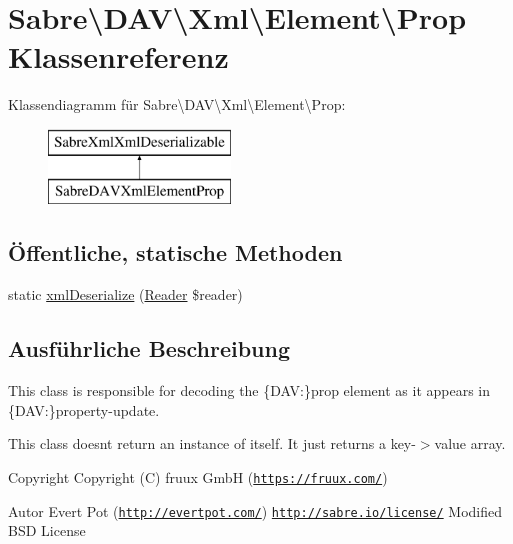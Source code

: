 \hypertarget{class_sabre_1_1_d_a_v_1_1_xml_1_1_element_1_1_prop}{}\section{Sabre\textbackslash{}D\+AV\textbackslash{}Xml\textbackslash{}Element\textbackslash{}Prop Klassenreferenz}
\label{class_sabre_1_1_d_a_v_1_1_xml_1_1_element_1_1_prop}
Klassendiagramm für Sabre\textbackslash{}D\+AV\textbackslash{}Xml\textbackslash{}Element\textbackslash{}Prop\+:\begin{figure}[H]
\begin{center}
\leavevmode
\includegraphics[height=2.000000cm]{class_sabre_1_1_d_a_v_1_1_xml_1_1_element_1_1_prop}
\end{center}
\end{figure}
\subsection*{Öffentliche, statische Methoden}
\begin{DoxyCompactItemize}
\item 
static \mbox{\hyperlink{class_sabre_1_1_d_a_v_1_1_xml_1_1_element_1_1_prop_acd9e1f30391301515157fe322d4a6eb2}{xml\+Deserialize}} (\mbox{\hyperlink{class_sabre_1_1_xml_1_1_reader}{Reader}} \$reader)
\end{DoxyCompactItemize}


\subsection{Ausführliche Beschreibung}
This class is responsible for decoding the \{D\+AV\+:\}prop element as it appears in \{D\+AV\+:\}property-\/update.

This class doesn\textquotesingle{}t return an instance of itself. It just returns a key-\/$>$value array.

\begin{DoxyCopyright}{Copyright}
Copyright (C) fruux GmbH (\href{https://fruux.com/}{\tt https\+://fruux.\+com/}) 
\end{DoxyCopyright}
\begin{DoxyAuthor}{Autor}
Evert Pot (\href{http://evertpot.com/}{\tt http\+://evertpot.\+com/})  \href{http://sabre.io/license/}{\tt http\+://sabre.\+io/license/} Modified B\+SD License 
\end{DoxyAuthor}


